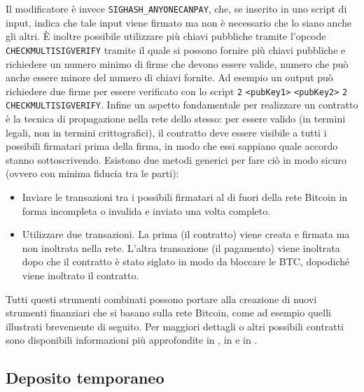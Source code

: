 Il modificatore è invece \verb|SIGHASH_ANYONECANPAY|, che, se inserito in uno script di input, indica che tale input viene firmato ma non è necessario che lo siano anche gli altri.
È inoltre possibile utilizzare più chiavi pubbliche tramite l'opcode \verb|CHECKMULTISIGVERIFY| tramite il quale si possono fornire più chiavi pubbliche e richiedere un numero minimo di firme che devono essere valide, numero che può anche essere minore del numero di chiavi fornite. Ad esempio un output può richiedere due firme per essere verificato con lo script \verb|2| \verb|<pubKey1>| \verb|<pubKey2>| \verb|2| \verb|CHECKMULTISIGVERIFY|.
Infine un aspetto fondamentale per realizzare un contratto è la tecnica di propagazione nella rete dello stesso: per essere valido (in termini legali, non in termini crittografici), il contratto deve essere visibile a tutti i possibili firmatari prima della firma, in modo che essi sappiano quale accordo stanno sottoscrivendo. Esistono due metodi generici per fare ciò in modo sicuro (ovvero con minima fiducia tra le parti):
\begin{itemize}
    \item Inviare le transazioni tra i possibili firmatari al di fuori della rete Bitcoin in forma incompleta o invalida e inviato una volta completo.
    \item Utilizzare due transazioni. La prima (il contratto) viene creata e firmata ma non inoltrata nella rete. L'altra transazione (il pagamento) viene inoltrata dopo che il contratto è stato siglato in modo da bloccare le BTC, dopodiché viene inoltrato il contratto.
\end{itemize}

Tutti questi strumenti combinati possono portare alla creazione di nuovi strumenti finanziari che si basano sulla rete Bitcoin, come ad esempio quelli illustrati brevemente di seguito. Per maggiori dettagli o altri possibili contratti sono disponibili informazioni più approfondite in \cite{bitcoin-contracts}, in \cite{nick-szabo} e in \cite{bitter-better}.

\subsection{Deposito temporaneo}

